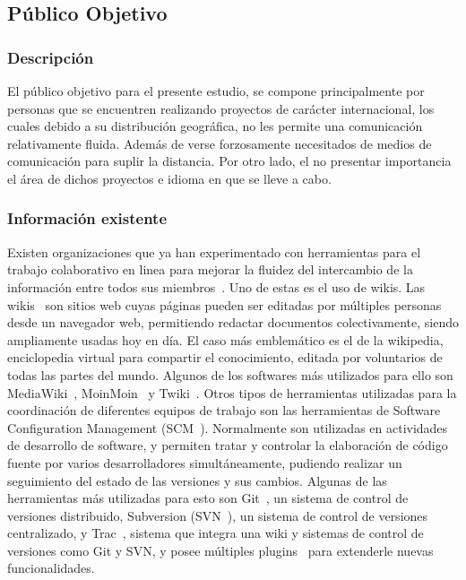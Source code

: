 \subsection{Público Objetivo}

\subsubsection{Descripción}
El público objetivo para el presente estudio, se compone principalmente
por personas que se encuentren realizando proyectos de carácter internacional, 
los cuales debido a su distribución geográfica, no les permite una comunicación
relativamente fluida. Además de verse forzosamente necesitados de medios de
comunicación para suplir la distancia. Por otro lado, el no presentar
importancia el área de dichos proyectos e idioma en que se lleve a cabo.

\subsubsection{Información existente}

Existen organizaciones que ya han experimentado con herramientas para el
trabajo colaborativo en linea para mejorar la fluidez del intercambio de la
información entre todos sus miembros~\cite{herramientas_trabajo_colaborativo}.
Uno de estas es el uso de wikis. Las wikis~\cite{wikis} son sitios web cuyas
páginas pueden ser editadas por múltiples personas desde un navegador web,
permitiendo redactar documentos colectivamente, siendo ampliamente usadas hoy
en día. El caso más emblemático es el de la wikipedia\cite{wikipedia},
enciclopedia virtual para compartir el conocimiento, editada por voluntarios
de todas las partes del mundo.
Algunos de los softwares más utilizados para ello son
MediaWiki~\cite{mediawiki}, MoinMoin~\cite{moinmoin} y Twiki~\cite{twiki}.
Otros tipos de herramientas utilizadas para la coordinación de diferentes equipos
de trabajo son las herramientas de Software Configuration Management
(SCM~\cite{scm}). Normalmente son utilizadas en actividades de desarrollo de
software, y permiten tratar y controlar la elaboración de código fuente por
varios desarrolladores simultáneamente, pudiendo realizar un seguimiento del
estado de las versiones y sus cambios. Algunas de las herramientas más utilizadas para
esto son Git~\cite{git}, un sistema de control de versiones distribuido,
Subversion (SVN~\cite{svn}), un sistema de control de versiones centralizado,
y  Trac~\cite{trac}, sistema que integra una wiki y sistemas de control de
versiones como Git y SVN, y posee múltiples plugins~\cite{plugin} para
extenderle nuevas funcionalidades.



